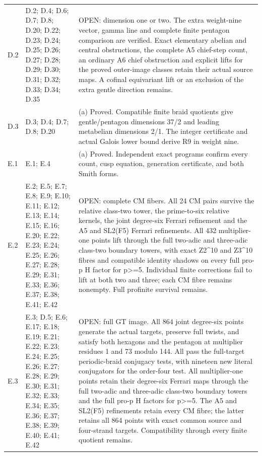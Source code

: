 \begin{longtable}{@{}p{1.1cm}p{3.0cm}p{10.3cm}@{}}
D.2 & D.2; D.4; D.6; D.7; D.8; D.20; D.22; D.23; D.24; D.25; D.26; D.27; D.28; D.29; D.30; D.31; D.32; D.33; D.34; D.35 & OPEN: dimension one or two. The extra weight-nine vector, gamma line and complete finite pentagon comparison are verified. Exact elementary abelian and central obstructions, the complete A5 chief-step count, an ordinary A6 chief obstruction and explicit lifts for the proved outer-image classes retain their actual source maps. A cofinal equivariant lift or an exclusion of the extra gentle direction remains. \\
D.3 & D.3; D.4; D.7; D.8; D.20 & (a) Proved. Compatible finite braid quotients give gentle/pentagon dimensions 37/2 and leading metabelian dimensions 2/1. The integer certificate and actual Galois lower bound derive R9 in weight nine. \\
E.1 & E.1; E.4 & (a) Proved. Independent exact programs confirm every count, cusp equation, generation certificate, and both Smith forms. \\
E.2 & E.2; E.5; E.7; E.8; E.9; E.10; E.11; E.12; E.13; E.14; E.15; E.16; E.20; E.22; E.23; E.24; E.25; E.26; E.27; E.28; E.29; E.31; E.33; E.36; E.37; E.38; E.41; E.42 & OPEN: complete CM fibers. All 24 CM pairs survive the relative class-two tower, the prime-to-six relative kernels, the joint degree-six Ferrari refinement and the A5 and SL2(F5) Ferrari refinements. All 432 multiplier-one points lift through the full two-adic and three-adic class-two boundary towers, with exact Z2^10 and Z3^10 fibres and compatible identity shadows on every full pro-p H factor for p>=5. Individual finite corrections fail to lift at both two and three; each CM fibre remains nonempty. Full profinite survival remains. \\
E.3 & E.3; D.5; E.6; E.17; E.18; E.19; E.21; E.22; E.23; E.24; E.25; E.26; E.27; E.28; E.29; E.30; E.31; E.32; E.33; E.34; E.35; E.36; E.37; E.38; E.39; E.40; E.41; E.42 & OPEN: full GT image. All 864 joint degree-six points generate the actual targets, preserve full twists, and satisfy both hexagons and the pentagon at multiplier residues 1 and 73 modulo 144. All pass the full-target periodic-braid conjugacy tests, with nineteen new literal conjugators for the order-four test. All multiplier-one points retain their degree-six Ferrari maps through the full two-adic and three-adic class-two boundary towers and the full pro-p H factors for p>=5. The A5 and SL2(F5) refinements retain every CM fibre; the latter retains all 864 points with exact common source and four-strand targets. Compatibility through every finite quotient remains. \\

\end{longtable}
